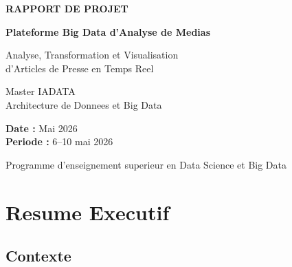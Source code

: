 \documentclass[12pt,a4paper]{report}
\begin{document}
\begin{titlepage}
\centering
\vspace*{2cm}

{\Large\bfseries\color{darkblue}
RAPPORT DE PROJET
}

\vspace{1.5cm}

{\LARGE\bfseries
Plateforme Big Data d'Analyse de Medias
}

\vspace{0.5cm}

{\Large
Analyse, Transformation et Visualisation\\
d'Articles de Presse en Temps Reel
}

\vspace{3cm}

{\large
Master IADATA\\
Architecture de Donnees et Big Data\\
}

\vspace{2cm}

{\large
\textbf{Date :} Mai 2026\\
\textbf{Periode :} 6--10 mai 2026\\
}

\vfill

{\large
Programme d'enseignement superieur en Data Science et Big Data
}

\end{titlepage}

\newpage
\thispagestyle{empty}
\mbox{}

\newpage
\tableofcontents

\chapter*{Resume Executif}

\section*{Contexte}
\end{document}
